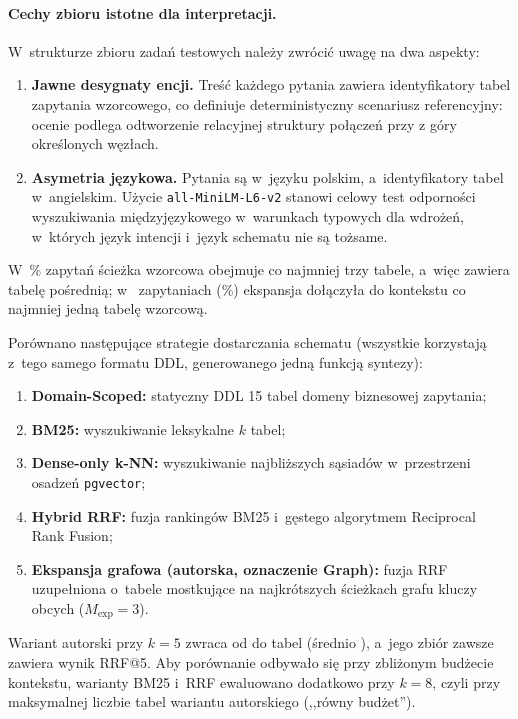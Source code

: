 \paragraph{Cechy zbioru istotne dla interpretacji.} W~strukturze zbioru zadań testowych należy zwrócić uwagę na dwa aspekty:
\begin{enumerate}
    \item \textbf{Jawne desygnaty encji.} Treść każdego pytania zawiera identyfikatory tabel zapytania wzorcowego, co definiuje deterministyczny scenariusz referencyjny: ocenie podlega odtworzenie relacyjnej struktury połączeń przy z góry określonych węzłach.
    \item \textbf{Asymetria językowa.} Pytania są w~języku polskim, a~identyfikatory tabel w~angielskim. Użycie \texttt{all-MiniLM-L6-v2} stanowi celowy test odporności wyszukiwania międzyjęzykowego w~warunkach typowych dla wdrożeń, w~których język intencji i~język schematu nie są tożsame.
\end{enumerate}
W~\wynGtGeThreePct\% zapytań ścieżka wzorcowa obejmuje co najmniej trzy tabele, a~więc zawiera tabelę pośrednią; w~\wynExpGainN{} zapytaniach (\wynExpGainPct\%) ekspansja dołączyła do kontekstu co najmniej jedną tabelę wzorcową.

Porównano następujące strategie dostarczania schematu (wszystkie korzystają z~tego samego formatu DDL, generowanego jedną funkcją syntezy):
\begin{enumerate}
    \item \textbf{Domain-Scoped:} statyczny DDL 15 tabel domeny biznesowej zapytania;
    \item \textbf{BM25:} wyszukiwanie leksykalne $k$ tabel;
    \item \textbf{Dense-only k-NN:} wyszukiwanie najbliższych sąsiadów w~przestrzeni osadzeń \texttt{pgvector};
    \item \textbf{Hybrid RRF:} fuzja rankingów BM25 i~gęstego algorytmem Reciprocal Rank Fusion;
    \item \textbf{Ekspansja grafowa (autorska, oznaczenie Graph):} fuzja RRF uzupełniona o~tabele mostkujące na najkrótszych ścieżkach grafu kluczy obcych ($M_{\text{exp}} = 3$).
\end{enumerate}
Wariant autorski przy $k = 5$ zwraca od \wynGraphTablesMin{} do \wynGraphTablesMax{} tabel (średnio \wynGraphTablesMean), a~jego zbiór zawsze zawiera wynik RRF@5. Aby porównanie odbywało się przy zbliżonym budżecie kontekstu, warianty BM25 i~RRF ewaluowano dodatkowo przy $k = 8$, czyli przy maksymalnej liczbie tabel wariantu autorskiego (,,równy budżet'').

